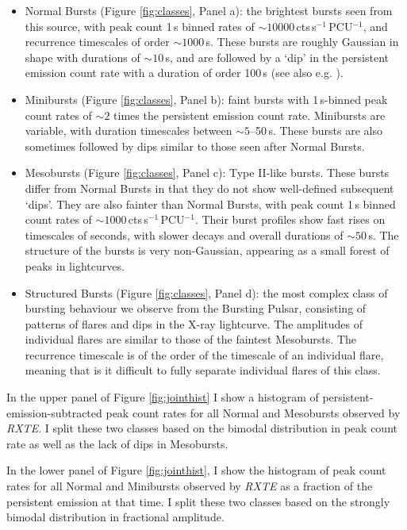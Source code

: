 \begin{itemize}
\item Normal Bursts (Figure \ref{fig:classes}, Panel a): the brightest bursts seen from this source, with peak count 1\,s binned rates of $\sim10000$\,cts\,s$^{-1}$\,PCU$^{-1}$, and recurrence timescales of order $\sim1000$\,s.  These bursts are roughly Gaussian in shape with durations of $\sim10$\,s, and are followed by a `dip' in the persistent emission count rate with a duration of order 100\,s (see also e.g. \citealp{Giles_BP}).
\item Minibursts (Figure \ref{fig:classes}, Panel b): faint bursts with 1\,s-binned peak count rates of $\sim2$ times the persistent emission count rate.  Minibursts are variable, with duration timescales between $\sim5$--50\,s.  These bursts are also sometimes followed by dips similar to those seen after Normal Bursts.
\item Mesobursts (Figure \ref{fig:classes}, Panel c): Type II-like bursts.  These bursts differ from Normal Bursts in that they do not show well-defined subsequent `dips'.  They are also fainter than Normal Bursts, with peak count 1\,s binned count rates of $\sim1000$\,cts\,s$^{-1}$\,PCU$^{-1}$.  Their burst profiles show fast rises on timescales of seconds, with slower decays and overall durations of $\sim50$\,s.  The structure of the bursts is very non-Gaussian, appearing as a small forest of peaks in lightcurves.
\item Structured Bursts (Figure \ref{fig:classes}, Panel d): the most complex class of bursting behaviour we observe from the Bursting Pulsar, consisting of patterns of flares and dips in the X-ray lightcurve.  The amplitudes of individual flares are similar to those of the faintest Mesobursts.  The recurrence timescale is of the order of the timescale of an individual flare, meaning that is it difficult to fully separate individual flares of this class.
\end{itemize}

\par In the upper panel of Figure \ref{fig:jointhist} I show a histogram of persistent-emission-subtracted peak count rates for all Normal and Mesobursts observed by \textit{RXTE}.  I split these two classes based on the bimodal distribution in peak count rate as well as the lack of dips in Mesobursts.
\par In the lower panel of Figure \ref{fig:jointhist}, I show the histogram of peak count rates for all Normal and Minibursts observed by \textit{RXTE} as a fraction of the persistent emission at that time.  I split these two classes based on the strongly bimodal distribution in fractional amplitude.

